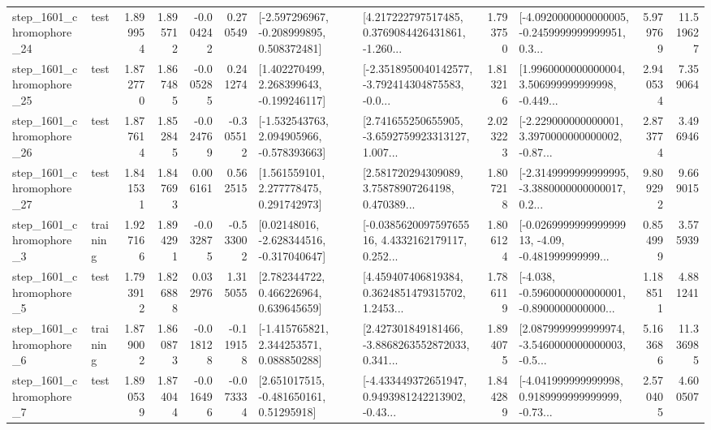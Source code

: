 \begin{tabular}{llrrrrllrlrr}
 step\_1601\_chromophore\_24 &      test &      1.899954 &    1.895712 &     -0.004242 &  0.270549 &   [-2.597296967, -0.208999895, 0.508372481] &  [4.217222797517485, 0.3769084426431861, -1.260... &       1.793750 &  [-4.0920000000000005, -0.2459999999999951, 0.3... &            5.979769 &         11.519627 \\
 step\_1601\_chromophore\_25 &      test &      1.872770 &    1.867485 &     -0.005285 &  0.241274 &    [1.402270499, 2.268399643, -0.199246117] &  [-2.3518950040142577, -3.792414304875583, -0.0... &       1.813216 &  [1.9960000000000004, 3.506999999999998, -0.449... &            2.940534 &          7.359064 \\
 step\_1601\_chromophore\_26 &      test &      1.877614 &    1.852845 &     -0.024769 & -0.305512 &   [-1.532543763, 2.094905966, -0.578393663] &  [2.741655250655905, -3.6592759923313127, 1.007... &       2.023223 &  [-2.229000000000001, 3.3970000000000002, -0.87... &            2.873774 &          3.496946 \\
 step\_1601\_chromophore\_27 &      test &      1.841531 &    1.847693 &      0.006161 &  0.562515 &     [1.561559101, 2.277778475, 0.291742973] &  [2.581720294309089, 3.75878907264198, 0.470389... &       1.807218 &  [-2.3149999999999995, -3.3880000000000017, 0.2... &            9.809292 &          9.669015 \\
  step\_1601\_chromophore\_3 &  training &      1.927166 &    1.894291 &     -0.032875 & -0.533002 &    [0.02148016, -2.628344516, -0.317040647] &  [-0.038562009759765516, 4.4332162179117, 0.252... &       1.806124 &  [-0.026999999999999913, -4.09, -0.481999999999... &            0.854999 &          3.575939 \\
  step\_1601\_chromophore\_5 &      test &      1.793912 &    1.826888 &      0.032976 &  1.315055 &     [2.782344722, 0.466226964, 0.639645659] &  [4.459407406819384, 0.3624851479315702, 1.2453... &       1.786119 &  [-4.038, -0.5960000000000001, -0.8900000000000... &            1.188511 &          4.881241 \\
  step\_1601\_chromophore\_6 &  training &      1.879002 &    1.860873 &     -0.018128 & -0.119158 &    [-1.415765821, 2.344253571, 0.088850288] &  [2.427301849181466, -3.8868263552872033, 0.341... &       1.894075 &  [2.0879999999999974, -3.5460000000000003, -0.5... &            5.163686 &         11.336985 \\
  step\_1601\_chromophore\_7 &      test &      1.890539 &    1.874044 &     -0.016496 & -0.073334 &     [2.651017515, -0.481650161, 0.51295918] &  [-4.433449372651947, 0.9493981242213902, -0.43... &       1.844289 &  [-4.041999999999998, 0.9189999999999999, -0.73... &            2.570405 &          4.600507 \\

\end{tabular}
